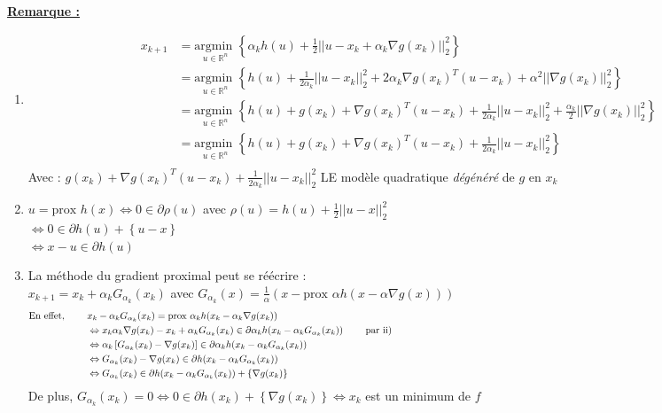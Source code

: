 \documentclass[12pt,a4paper]{article}
\begin{document}
\noindent\underline{\textbf{Remarque :}}
\begin{enumerate}[label=\roman*)]
    \item \begin{align*}
        x_{k+1} &= \underset{u \in \mathbb{R}^n}{\text{argmin }} \left\{\alpha_k h(u) + \frac{1}{2} ||u - x_k + \alpha_k \nabla g(x_k)||_2^2 \right\}\\
        &= \underset{u \in \mathbb{R}^n}{\text{argmin }} \left\{h(u) + \frac{1}{2 \alpha_k} ||u - x_k||_2^2 + 2 \alpha_k \nabla g(x_k)^T (u - x_k) + \alpha^2 ||\nabla g(x_k)||_2^2 \right\}\\
        &= \underset{u \in \mathbb{R}^n}{\text{argmin }} \left\{h(u) + g(x_k) + \nabla g(x_k)^T (u - x_k) + \frac{1}{2 \alpha_k} ||u - x_k||_2^2 + \frac{\alpha_k}{2} ||\nabla g(x_k)||_2^2 \right\}\\
        &= \underset{u \in \mathbb{R}^n}{\text{argmin }} \left\{h(u) + g(x_k) + \nabla g(x_k)^T (u - x_k) + \frac{1}{2 \alpha_k} ||u - x_k ||_2^2 \right\}\\
    \end{align*}
    Avec : $g(x_k) + \nabla g(x_k)^T (u - x_k) + \frac{1}{2 \alpha_k} ||u - x_k||_2^2$ LE modèle quadratique \textit{dégénéré} de $g$ en $x_k$\\
    \item $u = \text{prox } h(x) \Leftrightarrow 0 \in \partial \rho (u)$ avec $\rho (u) = h(u) + \frac{1}{2} ||u - x||_2^2$\\
    $\Leftrightarrow 0 \in \partial h(u) + \left\{u - x \right\}$\\
    $\Leftrightarrow x - u \in \partial h(u)$\\
    \item La méthode du gradient proximal peut se réécrire :\\
    $x_{k+1} = x_k + \alpha_k G_{\alpha_k} (x_k)$ avec $G_{\alpha_k}(x) = \frac{1}{\alpha} (x - \text{prox } \alpha h(x - \alpha \nabla g(x)))$\\
    
    \begin{align*}
        \text{En effet, } \qquad &x_k - \alpha_k G_{\alpha_k}(x_k) = \text{prox } \alpha_k h(x_k - \alpha_k \nabla g(x_k))\\
        &\Leftrightarrow x_k \alpha_k \nabla g(x_k) - x_k + \alpha_k G_{\alpha_k}(x_k) \in \partial \alpha_k h(x_k - \alpha_k G_{\alpha_k}(x_k)) \qquad \text{ par ii)} \hspace{14.5cm}\\
        &\Leftrightarrow \alpha_k \left[ G_{\alpha_k}(x_k) - \nabla g(x_k) \right] \in \partial \alpha_k h(x_k - \alpha_k G_{\alpha_k}(x_k))\\
        &\Leftrightarrow G_{\alpha_k}(x_k) - \nabla g(x_k) \in \partial h(x_k - \alpha_k G_{\alpha_k}(x_k))\\
        &\Leftrightarrow G_{\alpha_k}(x_k) \in \partial h(x_k - \alpha_k G_{\alpha_k}(x_k)) + \left\{ \nabla g(x_k) \right\}
    \end{align*}
    De plus, $G_{\alpha_k}(x_k) = 0 \Leftrightarrow 0 \in \partial h(x_k) + \left\{ \nabla g(x_k) \right\} \Leftrightarrow x_k$ est un minimum de $f$\\


\end{enumerate}
\end{document}
